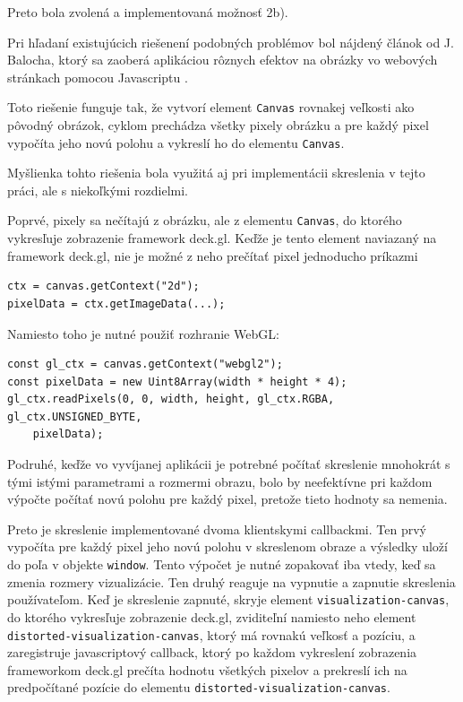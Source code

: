 Preto bola zvolená a implementovaná možnosť 2b).

Pri hľadaní existujúcich riešenení podobných problémov bol nájdený článok od J. Balocha, ktorý sa zaoberá aplikáciou rôznych efektov na obrázky vo webových stránkach pomocou Javascriptu \cite{baloch_distortion_in_js}.

Toto riešenie funguje tak, že vytvorí element \texttt{Canvas} rovnakej veľkosti ako pôvodný obrázok, cyklom prechádza všetky pixely obrázku a pre každý pixel vypočíta jeho novú polohu a vykreslí ho do elementu \texttt{Canvas}.

Myšlienka tohto riešenia bola využitá aj pri implementácii skreslenia v tejto práci, ale s niekoľkými rozdielmi.

Poprvé, pixely sa nečítajú z obrázku, ale z elementu \texttt{Canvas}, do ktorého vykresľuje zobrazenie framework deck.gl. Keďže je tento element naviazaný na framework deck.gl, nie je možné z neho prečítať pixel jednoducho príkazmi 

\begin{lstlisting}
ctx = canvas.getContext("2d");
pixelData = ctx.getImageData(...);
\end{lstlisting}

Namiesto toho je nutné použiť rozhranie WebGL:

\begin{lstlisting}
const gl_ctx = canvas.getContext("webgl2");
const pixelData = new Uint8Array(width * height * 4);
gl_ctx.readPixels(0, 0, width, height, gl_ctx.RGBA, gl_ctx.UNSIGNED_BYTE, 
    pixelData);
\end{lstlisting}

Podruhé, keďže vo vyvíjanej aplikácii je potrebné počítať skreslenie mnohokrát s tými istými parametrami a rozmermi obrazu, bolo by neefektívne pri každom výpočte počítať novú polohu pre každý pixel, pretože tieto hodnoty sa nemenia.

Preto je skreslenie implementované dvoma klientskymi callbackmi. Ten prvý vypočíta pre každý pixel jeho novú polohu v skreslenom obraze a výsledky uloží do poľa v objekte \texttt{window}. Tento výpočet je nutné zopakovať iba vtedy, keď sa zmenia rozmery vizualizácie. Ten druhý reaguje na vypnutie a zapnutie skreslenia používateľom. Keď je skreslenie zapnuté, skryje element \texttt{visualization-canvas}, do ktorého vykresľuje zobrazenie deck.gl, zviditeľní namiesto neho element \texttt{distorted-visualization-canvas}, ktorý má rovnakú veľkosť a pozíciu, a zaregistruje javascriptový callback, ktorý po každom vykreslení zobrazenia frameworkom deck.gl prečíta hodnotu všetkých pixelov a prekreslí ich na predpočítané pozície do elementu \texttt{distorted-visualization-canvas}.

